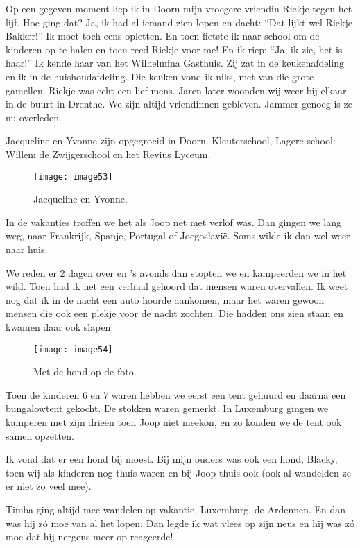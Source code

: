 Op een gegeven moment liep ik in Doorn mijn vroegere vriendin Riekje tegen het lijf. Hoe ging dat? Ja, ik had al iemand zien lopen en dacht: ``Dat lijkt wel Riekje Bakker!'' Ik moet toch eens opletten. En toen fietste ik naar school om de kinderen op te halen en toen reed Riekje voor me! En ik riep: ``Ja, ik zie, het is haar!'' Ik kende haar van het Wilhelmina Gasthuis. Zij zat in de keukenafdeling en ik in de huishoudafdeling. Die keuken vond ik niks, met van die grote gamellen. Riekje was echt een lief mens. Jaren later woonden wij weer bij elkaar in de buurt in Drenthe. We zijn altijd vriendinnen gebleven. Jammer genoeg is ze nu overleden.

Jacqueline en Yvonne zijn opgegroeid in Doorn. Kleuterschool, Lagere school: Willem de Zwijgerschool en het Revius Lyceum. 

\begin{figure}[h]
    \texttt{[image: image53]}
    \caption{Jacqueline en Yvonne.}
\end{figure}

In de vakanties troffen we het als Joop net met verlof was. Dan gingen we lang weg, naar Frankrijk, Spanje, Portugal of Joegoslavi\"{e}. Soms wilde ik dan wel weer naar huis.

We reden er 2 dagen over en ’s avonds dan stopten we en kampeerden we in het wild. Toen had ik net een verhaal gehoord dat mensen waren overvallen. Ik weet nog dat ik in de nacht een auto hoorde aankomen, maar het waren gewoon mensen die ook een plekje voor de nacht zochten. Die hadden ons zien staan en kwamen daar ook slapen.

\begin{figure}[h]
    \texttt{[image: image54]}
    \caption{Met de hond op de foto.}
\end{figure}

Toen de kinderen 6 en 7 waren hebben we eerst een tent gehuurd en daarna een bungalowtent gekocht. De stokken waren gemerkt. In Luxemburg gingen we kamperen met zijn drie\"{e}n toen Joop niet meekon, en zo konden we de tent ook samen opzetten.

Ik vond dat er een hond bij moest. Bij mijn ouders was ook een hond, Blacky, toen wij als kinderen nog thuis waren en bij Joop thuis ook (ook al wandelden ze er niet zo veel mee).

Timba ging altijd mee wandelen op vakantie, Luxemburg, de Ardennen. En dan was hij z\'{o} moe van al het lopen. Dan legde ik wat vlees op zijn neus en hij was z\'{o} moe dat hij nergens meer op reageerde!

